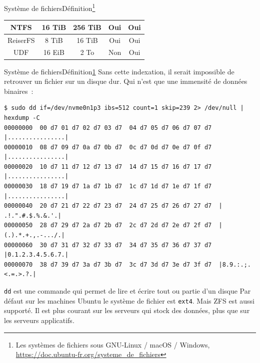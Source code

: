 \documentclass{beamer}
\begin{document}
\begin{frame}{Système de fichiers}{Définition\footnote{\label{fs}Les systèmes de fichiers sous GNU-Linux / macOS / Windows, \url{https://doc.ubuntu-fr.org/systeme_de_fichiers}}}
\begin{footnotesize}
\begin{table}[h!]
\begin{tabular}{|c|c|c|c|c|}
                    NTFS         & 16 TiB               & 256 TiB                & Oui                 & Oui                         \\ \hline
                    ReiserFS     & 8 TiB                & 16 TiB                 & Oui                 & Oui                         \\ \hline
                    UDF          & 16 EiB               & 2 To                   & Non                 & Oui                         \\ \hline
                \end{tabular}
            \end{table}
        \end{footnotesize}
    \end{frame}

    \begin{frame}[fragile]{Système de fichiers}{Définition\cref{fs}}
        Sans cette indexation, il serait impossible de retrouver un fichier sur un disque dur.
        Qui n'est que une immensité de données binaires~:
        \begin{lstlisting}
$ sudo dd if=/dev/nvme0n1p3 ibs=512 count=1 skip=239 2> /dev/null | hexdump -C
00000000  00 d7 01 d7 02 d7 03 d7  04 d7 05 d7 06 d7 07 d7  |................|
00000010  08 d7 09 d7 0a d7 0b d7  0c d7 0d d7 0e d7 0f d7  |................|
00000020  10 d7 11 d7 12 d7 13 d7  14 d7 15 d7 16 d7 17 d7  |................|
00000030  18 d7 19 d7 1a d7 1b d7  1c d7 1d d7 1e d7 1f d7  |................|
00000040  20 d7 21 d7 22 d7 23 d7  24 d7 25 d7 26 d7 27 d7  | .!.".#.$.%.&.'.|
00000050  28 d7 29 d7 2a d7 2b d7  2c d7 2d d7 2e d7 2f d7  |(.).*.+.,.-.../.|
00000060  30 d7 31 d7 32 d7 33 d7  34 d7 35 d7 36 d7 37 d7  |0.1.2.3.4.5.6.7.|
00000070  38 d7 39 d7 3a d7 3b d7  3c d7 3d d7 3e d7 3f d7  |8.9.:.;.<.=.>.?.|
        \end{lstlisting}
        \lstinline{dd} est une commande qui permet de lire et écrire tout ou partie d'un disque
        \bigbreak
        Par défaut sur les machines Ubuntu le système de fichier est \lstinline{ext4}.
        \bigbreak
        Mais ZFS est aussi supporté.
        Il est plus courant sur les serveurs qui stock des données, plus que sur les serveurs applicatifs.
    \end{frame}
\end{document}
